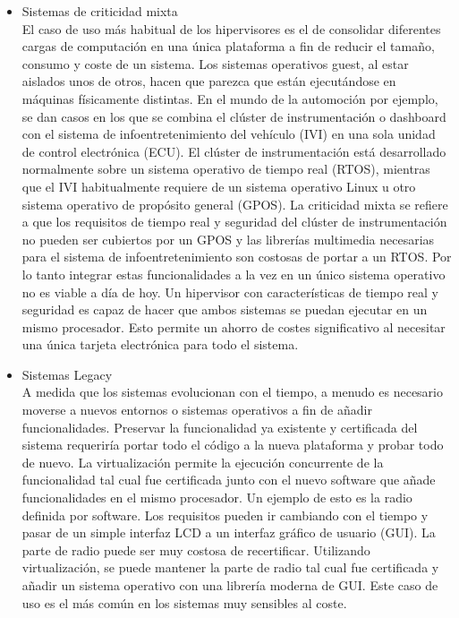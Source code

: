 \begin{itemize}
	\item Sistemas de criticidad mixta\\
	El caso de uso más habitual de los hipervisores es el de consolidar diferentes cargas de computación en una única
	plataforma a fin de reducir el tamaño, consumo y coste de un sistema. Los sistemas operativos guest, al estar aislados unos de otros, hacen que parezca que están ejecutándose en máquinas físicamente distintas. En el mundo de la automoción por ejemplo,
	se dan casos en los que se combina el clúster de instrumentación o dashboard con el sistema de infoentretenimiento del vehículo (\acrshort{IVI}) en una sola unidad de control electrónica (ECU). El clúster de instrumentación está desarrollado normalmente sobre un sistema operativo de tiempo real (\acrshort{RTOS}), mientras que el \acrshort{IVI} habitualmente requiere de un sistema operativo Linux u otro sistema operativo de propósito general (\acrshort{GPOS}). La criticidad mixta se refiere a que los requisitos de tiempo real y seguridad del clúster de instrumentación no pueden ser cubiertos por un \acrshort{GPOS} y las librerías multimedia necesarias para el sistema de infoentretenimiento son costosas de portar a un \acrshort{RTOS}. Por lo tanto integrar estas funcionalidades a la vez en un único sistema operativo no es viable a día de hoy. Un hipervisor con características de tiempo real y seguridad es capaz de hacer que ambos sistemas se puedan ejecutar en un mismo procesador. Esto permite un ahorro de costes significativo al necesitar una única tarjeta electrónica para todo el sistema.
	\item Sistemas Legacy\\
	A medida que los sistemas evolucionan con el tiempo, a menudo es necesario moverse a nuevos entornos o sistemas operativos a fin de añadir funcionalidades. Preservar la funcionalidad ya existente y certificada del sistema requeriría portar todo el código a la nueva plataforma y probar todo de nuevo. La virtualización permite la ejecución concurrente de la funcionalidad tal cual fue certificada junto con el nuevo software que añade funcionalidades en el mismo procesador. Un ejemplo de esto es la radio definida por software. Los requisitos pueden ir cambiando con el tiempo y pasar de un simple interfaz \acrshort{LCD} a un interfaz gráfico de usuario (\acrshort{GUI}). La parte de radio puede ser muy costosa de recertificar. Utilizando virtualización, se puede mantener la parte de radio tal cual fue certificada y añadir un sistema operativo con una librería moderna de \acrshort{GUI}.
	Este caso de uso es el más común en los sistemas muy sensibles al coste.\\[1cm]
\end{itemize}
